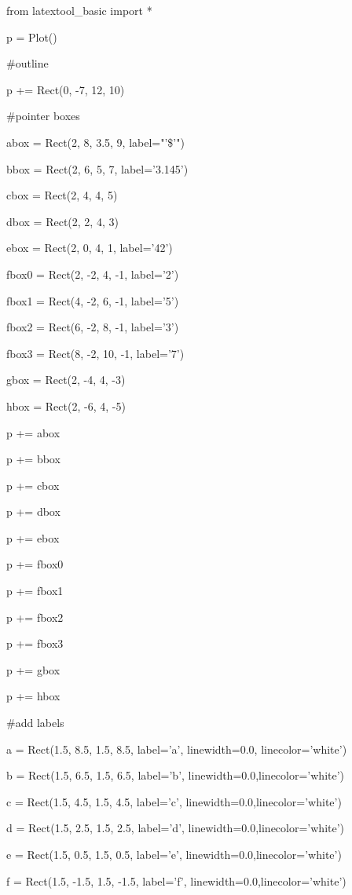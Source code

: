 \begin{python}

from latextool_basic import *

p = Plot()

#outline

p += Rect(0, -7, 12, 10)



#pointer boxes

abox = Rect(2, 8, 3.5, 9, label="'\$'")

bbox = Rect(2, 6, 5, 7, label='3.145')

cbox = Rect(2, 4, 4, 5)

dbox = Rect(2, 2, 4, 3)

ebox = Rect(2, 0, 4, 1, label='42')

fbox0 = Rect(2, -2, 4, -1, label='2')

fbox1 = Rect(4, -2, 6, -1, label='5')

fbox2 = Rect(6, -2, 8, -1, label='3')

fbox3 = Rect(8, -2, 10, -1, label='7')

gbox = Rect(2, -4, 4, -3)

hbox = Rect(2, -6, 4, -5)



p += abox

p += bbox

p += cbox

p += dbox

p += ebox

p += fbox0

p += fbox1

p += fbox2

p += fbox3

p += gbox

p += hbox



#add labels

a = Rect(1.5, 8.5, 1.5, 8.5, label='a', linewidth=0.0, linecolor='white')

b = Rect(1.5, 6.5, 1.5, 6.5, label='b', linewidth=0.0,linecolor='white')

c = Rect(1.5, 4.5, 1.5, 4.5, label='c', linewidth=0.0,linecolor='white')

d = Rect(1.5, 2.5, 1.5, 2.5, label='d', linewidth=0.0,linecolor='white')

e = Rect(1.5, 0.5, 1.5, 0.5, label='e', linewidth=0.0,linecolor='white')

f = Rect(1.5, -1.5, 1.5, -1.5, label='f', linewidth=0.0,linecolor='white')


\end{python}
